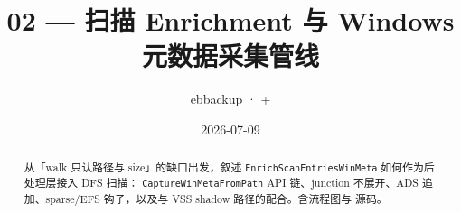\documentclass[12pt,a4paper]{ctexart}
\title{02 — 扫描 Enrichment 与 Windows 元数据采集管线}
\author{ebbackup · \filepath{scan\_entry.cc} + \filepath{winmeta/}}
\date{2026-07-09}
\begin{document}
\maketitle
\begin{abstract}
从「walk 只认路径与 size」的缺口出发，叙述 \texttt{EnrichScanEntriesWinMeta} 如何作为后处理层接入 DFS 扫描：
\texttt{CaptureWinMetaFromPath} API 链、junction 不展开、ADS 追加、sparse/EFS 钩子，以及与 VSS shadow 路径的配合。含流程图与  源码。
\end{abstract}
\tableofcontents
\newpage

\end{document}
